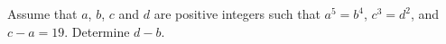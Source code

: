 Assume that $a$, $b$, $c$ and $d$ are positive integers such that $a^5=b^4$, $c^3=d^2$, and $c-a=19$. Determine $d-b$.
